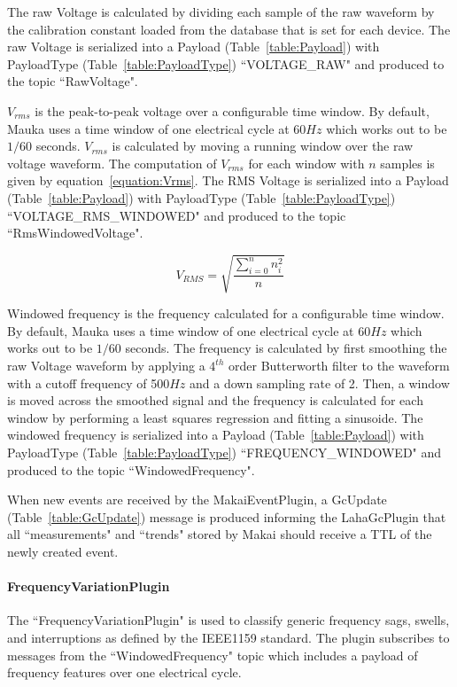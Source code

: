 The raw Voltage is calculated by dividing each sample of the raw waveform by the calibration constant loaded from the database that is set for each device. The raw Voltage  is serialized into a Payload (Table~\ref{table:Payload}) with PayloadType (Table~\ref{table:PayloadType}) ``VOLTAGE\_RAW" and produced to the topic ``RawVoltage".

$V_{rms}$ is the peak-to-peak voltage over a configurable time window. By default, Mauka uses a time window of one electrical cycle at 60$Hz$ which works out to be $1/60$ seconds. $V_{rms}$ is calculated by moving a running window over the raw voltage waveform. The computation of $V_{rms}$ for each window with $n$ samples is given by equation~\ref{equation:Vrms}. The RMS Voltage  is serialized into a Payload (Table~\ref{table:Payload}) with PayloadType (Table~\ref{table:PayloadType}) ``VOLTAGE\_RMS\_WINDOWED" and produced to the topic ``RmsWindowedVoltage".

\begin{equation}
\label{equation:Vrms}
	V_{RMS} = \sqrt{\frac{\sum_{i=0}^{n} n_{i}^2}{n}}
\end{equation}

Windowed frequency is the frequency calculated for a configurable time window. By default, Mauka uses a time window of one electrical cycle at 60$Hz$ which works out to be $1/60$ seconds. The frequency is calculated by first smoothing the raw Voltage waveform by applying a $4^{th}$ order Butterworth filter to the waveform with a cutoff frequency of 500$Hz$ and a down sampling rate of 2. Then, a window is moved across the smoothed signal and the frequency is calculated for each window by performing a least squares regression and fitting a sinusoide. The windowed frequency is serialized into a Payload (Table~\ref{table:Payload}) with PayloadType (Table~\ref{table:PayloadType}) ``FREQUENCY\_WINDOWED" and produced to the topic ``WindowedFrequency".

When new events are received by the MakaiEventPlugin, a GcUpdate (Table~\ref{table:GcUpdate}) message is produced informing the LahaGcPlugin that all ``measurements" and ``trends" stored by Makai should receive a TTL of the newly created event.

\paragraph{FrequencyVariationPlugin}
The ``FrequencyVariationPlugin" is used to classify generic frequency sags, swells, and interruptions as defined by the IEEE1159 standard\cite{IEEE:2018:1159D3}. The plugin subscribes to messages from the ``WindowedFrequency" topic which includes a payload of frequency features over one electrical cycle.

